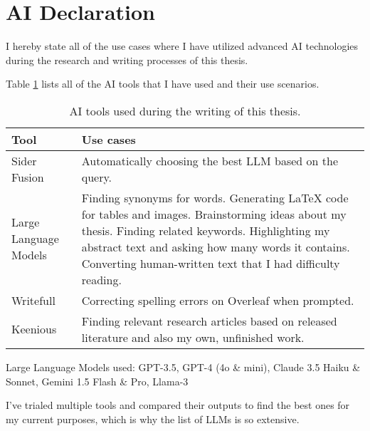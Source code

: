 



\chapter*{AI Declaration\label{extra:declaration}}

I hereby state all of the use cases where I have utilized advanced AI technologies during the research and writing processes of this thesis.

Table \ref{table:declaration} lists all of the AI tools that I have used and their use scenarios.

\begin{table}[h]
  \centering
  \begin{tabularx}{\textwidth}{>{\hsize=0.3\hsize}X >{\hsize=0.7\hsize}X}  
    \hline
    \textbf{Tool} & \textbf{Use cases} \\
    \hline
    Sider Fusion & Automatically choosing the best LLM based on the query. \\
    \hline
    Large Language Models & Finding synonyms for words. Generating LaTeX code for tables and images. Brainstorming ideas about my thesis. Finding related keywords. Highlighting my abstract text and asking how many words it contains. Converting human-written text that I had difficulty reading.\\
    \hline
    Writefull& Correcting spelling errors on Overleaf when prompted. \\
    \hline
    Keenious & Finding relevant research articles based on released literature and also my own, unfinished work. \\
    \hline
  \end{tabularx}
  \caption{AI tools used during the writing of this thesis.}
  \label{table:declaration}
\end{table}

Large Language Models used: GPT-3.5, GPT-4 (4o \& mini), Claude 3.5 Haiku \& Sonnet, Gemini 1.5 Flash \& Pro, Llama-3

I've trialed multiple tools and compared their outputs to find the best ones for my current purposes, which is why the list of LLMs is so extensive.